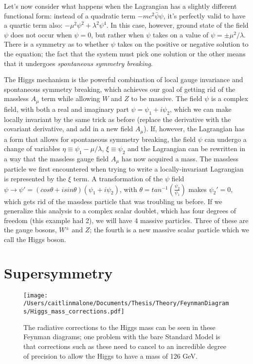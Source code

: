Let's now consider what happens when the Lagrangian has a slightly different functional form: instead of a quadratic term $-mc^2\bar{\psi}\psi$, it's perfectly valid to have a quartic term also: $-\mu^2\psi^2+\lambda^2 \psi^4$.  In this case, however, ground state of the field $\psi$ does not occur when $\psi=0$, but rather when $\psi$ takes on a value of $\psi = \pm \mu^2/\lambda$.  There is a symmetry as to whether $\psi$ takes on the positive or negative solution to the equation; the fact that the system must pick one solution or the other means that it undergoes \textit{spontaneous symmetry breaking}.

The Higgs mechanism is the powerful combination of local gauge invariance and spontaneous symmetry breaking, which achieves our goal of getting rid of the massless $A_\mu$ term while allowing $W$ and $Z$ to be massive.  The field $\psi$ is a complex field, with both a real and imaginary part $\psi=\psi_1+i\psi_2$, which we can make locally invariant by the same trick as before (replace the derivative with the covariant derivative, and add in a new field $A_\mu$).  If, however, the Lagrangian has a form that allows for spontaneous symmetry breaking, the field $\psi$ can undergo a change of variables $\eta\equiv \psi_1 - \mu/\lambda$, $\xi\equiv \psi_2$ and the Lagrangian can be rewritten in a way that the massless gauge field $A_\mu$ has now acquired a mass.  The massless particle we first encountered when trying to write a locally-invariant Lagrangian is represented by the $\xi$ term.  A transformation of the $\psi$ field $\psi \rightarrow \psi' = (cos\theta + i sin\theta)(\psi_1+i\psi_2)$, with $\theta=tan^{-1}(\frac{\psi_2}{\psi_1})$ makes $\psi_2'=0$, which gets rid of the massless particle that was troubling us before.  If we generalize this analysis to a  complex scalar doublet, which has four degrees of freedom (this example had 2), we will have 4 massive particles.  Three of these are the gauge bosons, $W^\pm$ and $Z$; the fourth is a new massive scalar particle which we call the Higgs boson.



 
 
 
\section{Supersymmetry}

\begin{centering}
    \begin{figure}
    \texttt{[image: /Users/caitlinmalone/Documents/Thesis/Theory/FeynmanDiagrams/Higgs\_mass\_corrections.pdf]}
    \caption{The radiative corrections to the Higgs mass can be seen
    in these Feynman diagrams; one problem with the bare Standard Model
    is that corrections such as these need to cancel to an incredible
    degree of precision to allow the Higgs to have a mass of 126 GeV.
    \label{fig:higgs_mass_corrections}}
    \end{figure}
\end{centering}

